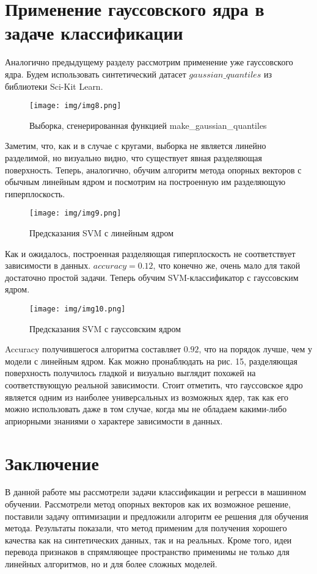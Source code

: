 \documentclass[twoside,twocolumn]{article}
\theoremstyle{plain}
\theoremstyle{definition}
\begin{document}
 \section{Применение гауссовского ядра в задаче классификации}
 Аналогично предыдущему разделу рассмотрим применение уже гауссовского ядра. Будем использовать синтетический датасет $gaussian\_quantiles$
 из библиотеки Sci-Kit Learn.
 \begin{figure}[!h]
  \caption{Выборка, сгенерированная функцией make\_gaussian\_quantiles}
  \centering
  \texttt{[image: img/img8.png]}
  \label{fig:gaus1}
\end{figure}
Заметим, что, как и в случае с кругами, выборка не является линейно разделимой, но визуально видно, что существует явная разделяющая поверхность. 
Теперь, аналогично, обучим алгоритм метода опорных векторов с обычным линейным ядром и посмотрим на построенную им разделяющую гиперплоскость.
\begin{figure}[!h]
  \caption{Предсказания SVM с линейным ядром}
  \centering
  \texttt{[image: img/img9.png]}
  \label{fig:gaus2}
\end{figure}
Как и ожидалось, построенная разделяющая гиперплоскость не соответствует зависимости в данных. $accuracy = 0.12$, что конечно же, очень мало для
такой достаточно простой задачи. Теперь обучим SVM-классификатор с гауссовским ядром.
\begin{figure}[!h]
  \caption{Предсказания SVM с гауссовским ядром}
  \centering
  \texttt{[image: img/img10.png]}
  \label{fig:gaus2}
\end{figure}
Accuracy получившегося алгоритма составляет $0.92$, что на порядок лучше, чем у модели с линейным ядром. Как можно пронаблюдать на рис. 15,
разделяющая поверхность получилось гладкой и визуально выглядит похожей на соответствующую реальной зависимости. Стоит отметить, что гауссовское ядро
является одним из наиболее универсальных из возможных ядер, так как его можно использовать даже в том случае, когда мы не обладаем какими-либо
априорными знаниями о характере зависимости в данных.

\section{Заключение}
В данной работе мы рассмотрели задачи классификации и регресси в машинном обучении. Рассмотрели метод опорных векторов как их возможное решение, поставили задачу
оптимизации и предложили алгоритм ее решения для обучения метода. Результаты показали, что метод применим для получения хорошего качества как на синтетических
данных, так и на реальных. Кроме того, идеи перевода признаков в спрямляющее пространство применимы не только для линейных алгоритмов, но и для более сложных
моделей.
\end{document}
